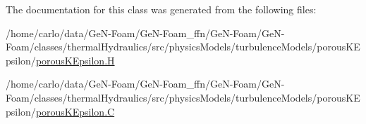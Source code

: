 The documentation for this class was generated from the following files\+:\begin{DoxyCompactItemize}
\item 
/home/carlo/data/\+Ge\+N-\/\+Foam/\+Ge\+N-\/\+Foam\+\_\+ffn/\+Ge\+N-\/\+Foam/\+Ge\+N-\/\+Foam/classes/thermal\+Hydraulics/src/physics\+Models/turbulence\+Models/porous\+K\+Epsilon/\hyperlink{porousKEpsilon_8H}{porous\+K\+Epsilon.\+H}\item 
/home/carlo/data/\+Ge\+N-\/\+Foam/\+Ge\+N-\/\+Foam\+\_\+ffn/\+Ge\+N-\/\+Foam/\+Ge\+N-\/\+Foam/classes/thermal\+Hydraulics/src/physics\+Models/turbulence\+Models/porous\+K\+Epsilon/\hyperlink{porousKEpsilon_8C}{porous\+K\+Epsilon.\+C}\end{DoxyCompactItemize}
